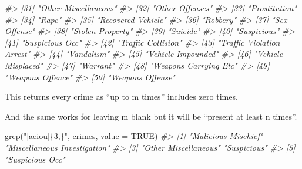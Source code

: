 \documentclass[
  12pt,
]{book}
\newenvironment{Shaded}{\begin{snugshade}}{\end{snugshade}}
\newcommand{\AttributeTok}[1]{\textcolor[rgb]{0.61,0.61,0.61}{#1}}
\newcommand{\CommentTok}[1]{\textcolor[rgb]{0.37,0.37,0.37}{\textit{#1}}}
\newcommand{\ConstantTok}[1]{\textcolor[rgb]{0,0,0}{#1}}
\newcommand{\FunctionTok}[1]{\textcolor[rgb]{0,0,0}{#1}}
\newcommand{\NormalTok}[1]{#1}
\newcommand{\StringTok}[1]{\textcolor[rgb]{0.5,0.5,0.5}{#1}}
\begin{document}
\begin{Shaded}
\begin{Highlighting}[]
\CommentTok{\#\textgreater{} [31] "Other Miscellaneous"                       }
\CommentTok{\#\textgreater{} [32] "Other Offenses"                            }
\CommentTok{\#\textgreater{} [33] "Prostitution"                              }
\CommentTok{\#\textgreater{} [34] "Rape"                                      }
\CommentTok{\#\textgreater{} [35] "Recovered Vehicle"                         }
\CommentTok{\#\textgreater{} [36] "Robbery"                                   }
\CommentTok{\#\textgreater{} [37] "Sex Offense"                               }
\CommentTok{\#\textgreater{} [38] "Stolen Property"                           }
\CommentTok{\#\textgreater{} [39] "Suicide"                                   }
\CommentTok{\#\textgreater{} [40] "Suspicious"                                }
\CommentTok{\#\textgreater{} [41] "Suspicious Occ"                            }
\CommentTok{\#\textgreater{} [42] "Traffic Collision"                         }
\CommentTok{\#\textgreater{} [43] "Traffic Violation Arrest"                  }
\CommentTok{\#\textgreater{} [44] "Vandalism"                                 }
\CommentTok{\#\textgreater{} [45] "Vehicle Impounded"                         }
\CommentTok{\#\textgreater{} [46] "Vehicle Misplaced"                         }
\CommentTok{\#\textgreater{} [47] "Warrant"                                   }
\CommentTok{\#\textgreater{} [48] "Weapons Carrying Etc"                      }
\CommentTok{\#\textgreater{} [49] "Weapons Offence"                           }
\CommentTok{\#\textgreater{} [50] "Weapons Offense"}
\end{Highlighting}
\end{Shaded}

This returns every crime as ``up to m times'' includes zero times.

And the same works for leaving m blank but it will be ``present at least n times''.

\begin{Shaded}
\begin{Highlighting}[]
\FunctionTok{grep}\NormalTok{(}\StringTok{"[aeiou]\{3,\}"}\NormalTok{, crimes, }\AttributeTok{value =} \ConstantTok{TRUE}\NormalTok{)}
\CommentTok{\#\textgreater{} [1] "Malicious Mischief"          "Miscellaneous Investigation"}
\CommentTok{\#\textgreater{} [3] "Other Miscellaneous"         "Suspicious"                 }
\CommentTok{\#\textgreater{} [5] "Suspicious Occ"}
\end{Highlighting}
\end{Shaded}
\end{document}
